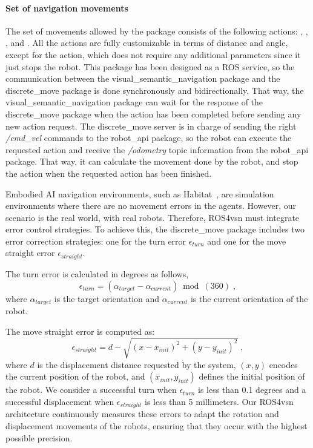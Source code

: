\paragraph*{\textbf{Set of navigation movements}}\label{par:movement-set}

The set of movements allowed by the package consists of the following actions: \turnleft, \turnright, \moveforward, \movebackward and \stopac.
All the actions are fully customizable in terms of distance and angle, except for the \stopac action, which does not require any additional parameters since it just stops the robot.
This package has been designed as a ROS service, so the communication between the visual\_semantic\_navigation package and the discrete\_move package is done synchronously and bidirectionally.
That way, the visual\_semantic\_navigation package can wait for the response of the discrete\_move package when the action has been completed before sending any new action request.
The discrete\_move server is in charge of sending the right \textit{/cmd\_vel} commands to the robot\_api package, so the robot can execute the requested action and receive the \textit{/odometry} topic information from the robot\_api package.
That way, it can calculate the movement done by the robot, and stop the action when the requested action has been finished.

Embodied AI navigation environments, such as Habitat~\cite{NEURIPS2021_021bbc7e}, are simulation environments where there are no movement errors in the agents.
However, our scenario is the real world, with real robots.
Therefore, ROS4\acrshort{vsn} must integrate error control strategies.
To achieve this, the discrete\_move package includes two error correction strategies: one for the turn error $\epsilon_{turn}$ and one for the move straight error $\epsilon_{straight}$.

The turn error is calculated in degrees as follows,
\begin{equation}
    \label{eq:turn_error}
    \epsilon_{turn} = (\alpha_{target}- \alpha_{current}) \bmod(360)\; ,
\end{equation}
where $\alpha_{target}$ is the target orientation and $\alpha_{current}$ is the current orientation of the robot.

The move straight error is computed as:
\begin{equation}
    \label{eq:error_move}
    \epsilon_{straight} = {d - \sqrt{(x-x_{init})^2+(y-y_{init})^2}}\; ,
\end{equation}
where $d$ is the displacement distance requested by the system, $(x,y)$ encodes the current position of the robot, and $(x_{init},y_{init})$ defines the initial position of the robot.
We consider a successful turn when $\epsilon_{turn}$ is less than 0.1 degrees and a successful displacement when $\epsilon_{straight}$ is less than 5 millimeters.
Our ROS4\acrshort{vsn} architecture continuously measures these errors to adapt the rotation and displacement movements of the robots, ensuring that they occur with the highest possible precision.

